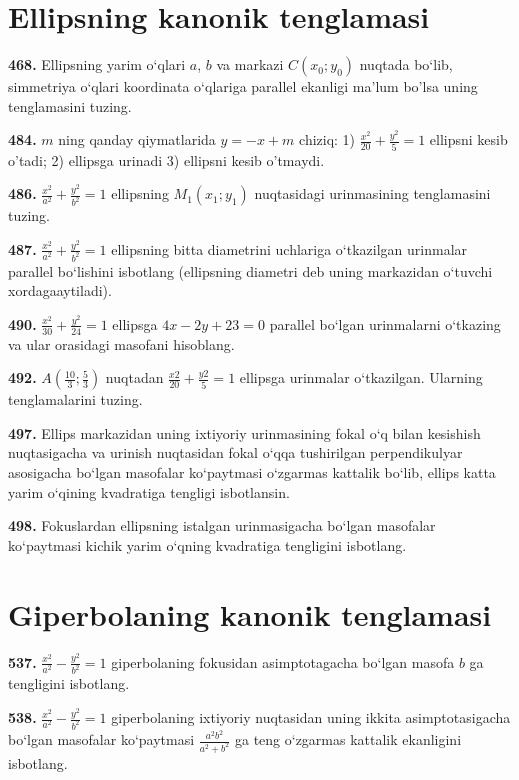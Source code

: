 \section{Ellipsning kanonik tenglamasi}


\textbf{468.} Ellipsning yarim o‘qlari $a$, $b$ va markazi $C\left(x_0; y_0\right)$ nuqtada bo‘lib, simmetriya o‘qlari koordinata o‘qlariga parallel ekanligi ma’lum bo'lsa uning tenglamasini tuzing.

\textbf{484.} $m$ ning qanday qiymatlarida $y=-x+m$ chiziq: 1) $\frac{x^2}{20}+\frac{y^2}{5}=1$ ellipsni kesib o'tadi; 2) ellipsga urinadi 3) ellipsni kesib o'tmaydi.

\textbf{486.} $\frac{x^2}{a^2}+\frac{y^2}{b^2}=1$ ellipsning $M_1(x_1; y_1)$ nuqtasidagi urinmasining tenglamasini tuzing.

\textbf{487.} $\frac{x^2}{a^2}+\frac{y^2}{b^2}=1$ ellipsning bitta diametrini uchlariga o‘tkazilgan urinmalar parallel bo‘lishini isbotlang (ellipsning diametri deb uning markazidan o‘tuvchi xordagaaytiladi).

\textbf{490.} $\frac{x^2}{30}+\frac{y^2}{24}=1$ ellipsga $4x-2y+23=0$ parallel bo‘lgan urinmalarni o‘tkazing va ular orasidagi masofani hisoblang.

\textbf{492.} $A\left(\frac{10}{3}; \frac{5}{3}\right)$ nuqtadan $\frac{x2}{20}+\frac{y2}{5}=1$ ellipsga urinmalar o‘tkazilgan. Ularning tenglamalarini tuzing.

\textbf{497.} Ellips markazidan uning ixtiyoriy urinmasining fokal o‘q bilan kesishish nuqtasigacha va urinish nuqtasidan fokal o‘qqa tushirilgan perpendikulyar asosigacha bo‘lgan masofalar ko‘paytmasi o‘zgarmas kattalik bo‘lib, ellips katta yarim o‘qining kvadratiga tengligi isbotlansin.

\textbf{498.} Fokuslardan ellipsning istalgan urinmasigacha bo‘lgan masofalar ko‘paytmasi kichik yarim o‘qning kvadratiga tengligini isbotlang.



\section{Giperbolaning kanonik tenglamasi}



\textbf{537.} $\frac{x^2}{a^2}-\frac{y^2}{b^2}=1$ giperbolaning fokusidan asimptotagacha bo‘lgan masofa $b$ ga tengligini isbotlang.

\textbf{538.} $\frac{x^2}{a^2}-\frac{y^2}{b^2}=1$ giperbolaning ixtiyoriy nuqtasidan uning ikkita asimptotasigacha bo‘lgan masofalar ko‘paytmasi $\frac{a^2 b^2}{a^2+b^2}$ ga teng o‘zgarmas kattalik ekanligini isbotlang.

